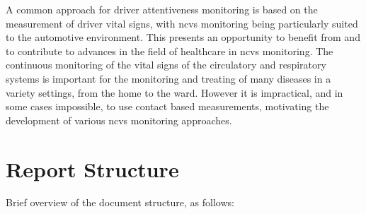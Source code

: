 \documentclass[11pt, parskip=half*,twoside=false]{scrbook}
\begin{document}
A common approach for driver attentiveness monitoring is based on the measurement of driver vital signs, with \gls{ncvs} monitoring being particularly suited to the automotive environment. This presents an opportunity to benefit from and to contribute to advances in the field of healthcare in \gls{ncvs} monitoring. The continuous monitoring of the vital signs of the circulatory and respiratory systems is important for the monitoring and treating of many diseases in a variety settings, from the home to the ward. However it is impractical, and in some cases impossible, to use contact based measurements, motivating the development of various \gls{ncvs} monitoring approaches. 


\section{Report Structure} \label{sec:struct}
Brief overview of the document structure, as follows:
\end{document}
